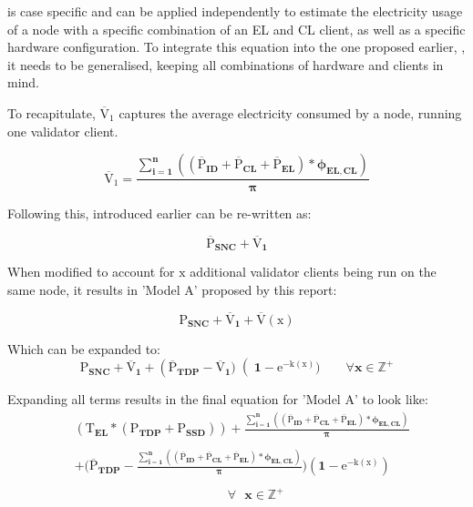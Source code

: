  is case specific and can be applied independently to estimate the electricity usage of a node with a specific combination of an EL and CL client, as well as a specific hardware configuration. To integrate this equation into the one proposed earlier, , it needs to be generalised, keeping all combinations of hardware and clients in mind.

To recapitulate, $\boldsymbol{\mathrm{\overline{V}_{1}}}$ captures the average electricity consumed by a node, running one validator client. 

\begin{equation*}
    \boldsymbol{\mathrm{\overline{V}_{1}} = {\frac{\displaystyle\sum\limits_{i=1}^{n}{ \left({\left(\mathrm{\overline{P}}_{ID} + \mathrm{\overline{P}}_{CL} + \mathrm{\overline{P}}_{EL}\right)} * {\phi_{EL,CL}} \right)}}
{\pi}} }
\end{equation*}

Following this,  introduced earlier can be re-written as:

\begin{equation*}
     \boldsymbol{\overline{\mathrm{P}}_{SNC} +  \overline{\mathrm{V}}_{1} 
} 
\end{equation*}

When modified to account for $\boldsymbol{\mathrm{x }}$ additional validator clients being run on the same node, it results in 'Model A' proposed by this report: 

\begin{equation}
\label{eqn:FinalEqnShort}
     \boldsymbol{\mathrm{P}_{SNC} +  \overline{\mathrm{V}}_{1} + \mathrm{\overline{V}(\mathrm{x})}} 
\end{equation}

Which can be expanded to:
\begin{equation*}
     \boldsymbol{\mathrm{P}_{SNC} +  \overline{\mathrm{V}}_{1} + {\left(\mathrm{\overline{P}}_{TDP} -\overline{\mathrm{V}}_{1} )\right(1-\mathrm{e}^{-\mathrm{k}(\mathrm{x})}) \qquad \forall x \in \mathbb{Z}^+}} 
\end{equation*}

Expanding all terms results in the final equation for 'Model A' to look like:
\begin{align}
\label{eqn:FinalEqnLong}
     &\boldsymbol{({\mathrm{T}_{EL} * ({\mathrm{P}_{TDP}} + \mathrm{P}_{SSD})}) +  {\frac{\displaystyle\sum\limits_{i=1}^{n}{ \left({\left(\mathrm{\overline{P}}_{ID} + \mathrm{\overline{P}}_{CL} + \mathrm{\overline{P}}_{EL}\right)} * {\phi_{EL,CL}} \right)}}
{\pi}}}\nonumber \\  \nonumber\\  
     &\boldsymbol{+ {(\mathrm{\overline{P}}_{TDP} - {\frac{\displaystyle\sum\limits_{i=1}^{n}{ \left({\left(\mathrm{\overline{P}}_{ID} + \mathrm{\overline{P}}_{CL} + \mathrm{\overline{P}}_{EL}\right)} * {\phi_{EL,CL}} \right)}}
{\pi}}} ) (1-\mathrm{e}^{-\mathrm{k}(\mathrm{x})})}\\ \nonumber \\    
     &\boldsymbol{\qquad \qquad \qquad \qquad \qquad \qquad \forall \text{ } x \in \mathbb{Z}^+}\nonumber 
\end{align}

